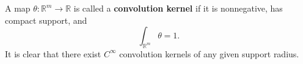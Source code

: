 A map $\theta: \mathbb{R}^m \to \mathbb{R}$ is called a \textbf{convolution kernel} if it is nonnegative, has compact support, and
$$\int_{\mathbb{R}^m} \theta = 1.$$
It is clear that there exist $C^\infty$ convolution kernels of any given support radius.

